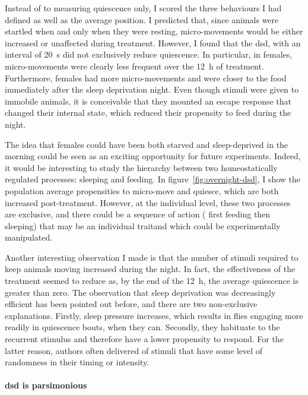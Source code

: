 Instead of to measuring quiescence only, I scored the three behaviours I had defined as well as the average position.
I predicted that, since animals were startled when and only when they were resting, micro-movements would be either increased or unaffected during treatment.
However, I found that the \gls{dsd}, with an interval of 20~s did not exclusively reduce quiescence.
In particular, in females, micro-movements were clearly less frequent over the 12~h of treatment. 
Furthermore, females had more micro-movements and were closer to the food immediately after the sleep deprivation night.
Even though stimuli were given to immobile animals, it is conceivable that they mounted an escape response that changed their internal state, which reduced their propensity to feed during the night.

The idea that females could have been both starved and sleep-deprived in the morning could be seen as an exciting opportunity for future experiments.
Indeed, it would be interesting to study the hierarchy between two homeostatically regulated processes: sleeping and feeding.
In figure~\ref{fig:overnight-dsd}, I show the population average propensities to micro-move and quiesce, which are both increased post-treatment. 
However, at the individual level, these two processes are exclusive, and there could be a sequence of action (\eg{} first feeding then sleeping) that may be an individual trait\emd{}and which could be experimentally manipulated.

Another interesting observation I made is that the number of stimuli required to keep animals moving increased during the night.
In fact, the effectiveness of the treatment seemed to reduce as, by  the end of the 12~h, the average quiescence is greater than zero.
The observation that sleep deprivation was decreasingly efficient has been pointed out before, and there are two non-exclusive explanations.
Firstly, sleep pressure increases, which results in flies engaging more readily in quiescence bouts, when they can.
Secondly, they habituate to the recurrent stimulus and therefore have a lower propensity to respond.
For the latter reason, authors often delivered of stimuli that have some level of randomness in their timing\cite{hendricks_need_2000} or intensity\cite{faville_how_2015}.


\paragraph*{\gls{dsd} is parsimonious}

